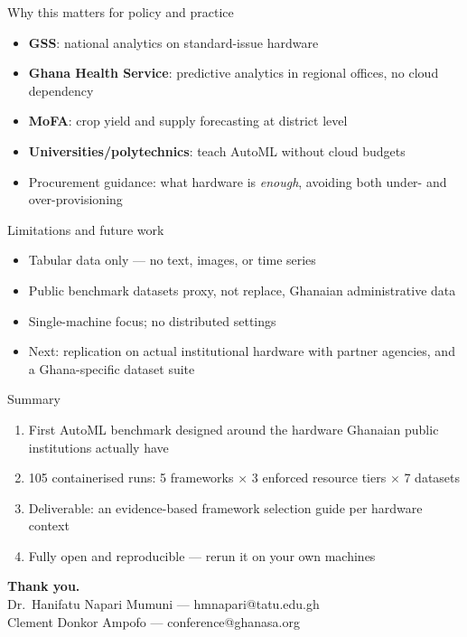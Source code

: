\documentclass[aspectratio=169,10pt]{beamer}
\begin{document}
\begin{frame}{Why this matters for policy and practice}
  \begin{itemize}
    \item \textbf{GSS}: national analytics on standard-issue hardware
    \item \textbf{Ghana Health Service}: predictive analytics in regional
          offices, no cloud dependency
    \item \textbf{MoFA}: crop yield and supply forecasting at district level
    \item \textbf{Universities/polytechnics}: teach AutoML without cloud
          budgets
    \item Procurement guidance: what hardware is \emph{enough}, avoiding
          both under- and over-provisioning
  \end{itemize}
\end{frame}

\begin{frame}{Limitations and future work}
  \begin{itemize}
    \item Tabular data only --- no text, images, or time series
    \item Public benchmark datasets proxy, not replace, Ghanaian
          administrative data
    \item Single-machine focus; no distributed settings
    \item Next: replication on actual institutional hardware with partner
          agencies, and a Ghana-specific dataset suite
  \end{itemize}
\end{frame}

\begin{frame}{Summary}
  \begin{enumerate}
    \item First AutoML benchmark designed around the hardware Ghanaian
          public institutions actually have
    \item 105 containerised runs: 5 frameworks $\times$ 3 enforced resource
          tiers $\times$ 7 datasets
    \item Deliverable: an evidence-based framework selection guide per
          hardware context
    \item Fully open and reproducible --- rerun it on your own machines
  \end{enumerate}
  \vfill
  \centering
  \textbf{Thank you.} \\[1ex]
  \small Dr.~Hanifatu Napari Mumuni --- hmnapari@tatu.edu.gh \\
  Clement Donkor Ampofo --- conference@ghanasa.org
\end{frame}
\end{document}
